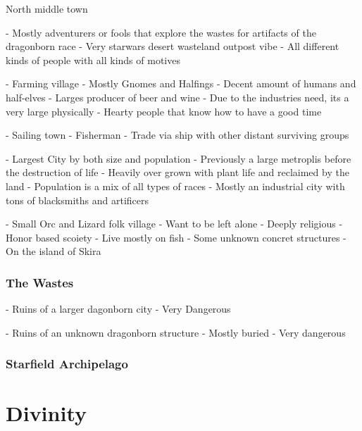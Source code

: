 \documentclass[letterpaper,twocolumn,openany,nodeprecatedcode]{dndbook}
\begin{document}

North middle town

- Mostly adventurers or fools that explore the wastes for artifacts of the dragonborn race
- Very starwars desert wasteland outpost vibe
- All different kinds of people with all kinds of motives

- Farming village
- Mostly Gnomes and Halfings
- Decent amount of humans and half-elves
- Larges producer of beer and wine
- Due to the industries need, its a very large physically
- Hearty people that know how to have a good time

- Sailing town
- Fisherman
- Trade via ship with other distant surviving groups

- Largest City by both size and population
- Previously a large metroplis before the destruction of life
- Heavily over grown with plant life and reclaimed by the land
- Population is a mix of all types of races
- Mostly an industrial city with tons of blacksmiths and artificers

- Small Orc and Lizard folk village
- Want to be left alone
- Deeply religious
- Honor based scoiety
- Live mostly on fish
- Some unknown concret structures
- On the island of Skira

\subsection{The Wastes}

- Ruins of a larger dagonborn city
- Very Dangerous

- Ruins of an unknown dragonborn structure
- Mostly buried
- Very dangerous

\subsection{Starfield Archipelago}

\chapter{Divinity}
\end{document}
